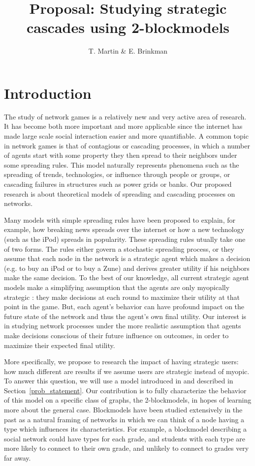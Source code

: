 \documentclass{article}
\title{Proposal: Studying strategic cascades using 2-blockmodels}
\author{T. Martin \& E. Brinkman}
\begin{document}
\maketitle

\section{Introduction}
\label{intro}

The study of network games is a relatively new and very active area of research. It has become both more important and more applicable since the internet has made large scale social interaction easier and more quantifiable. A common topic in network games is that of contagious or cascading processes, in which a number of agents start with some property they then spread to their neighbors under some spreading rules. This model naturally represents phenomena such as the spreading of trends, technologies, or influence through people or groups, or cascading failures in structures such as power grids or banks. Our proposed research is about theoretical models of spreading and cascading processes on networks.

Many models with simple spreading rules have been proposed \cite{Arthur89, Morris00, Watts02} to explain, for example, how breaking news spreads over the internet or how a new technology (such as the iPod) spreads in popularity. These spreading rules utually take one of two forms. The rules either govern a stochastic spreading process, or they assume that each node in the network is a strategic agent which makes a decision (e.g. to buy an iPod or to buy a Zune) and derives greater utility if his neighbors make the same decision. To the best of our knowledge, all current strategic agent models make a simplifying assumption that the agents are only myopically strategic \cite{Chierichetti12}: they make decisions at each round to maximize their utility at that point in the game. But, each agent's behavior can have profound impact on the future state of the network and thus the agent's own final utility. Our interest is in studying network processes under the more realistic assumption that agents make decisions conscious of their future influence on outcomes, in order to maximize their expected final utility.

More specifically, we propose to research the impact of having strategic users: how much different are results if we assume users are strategic instead of myopic. To answer this question, we will use a model introduced in \cite{Chierichetti12} and described in Section~\ref{prob_statement}. Our contribution is to fully characterize the behavior of this model on a specific class of graphs, the 2-blockmodels, in hopes of learning more about the general case. Blockmodels have been studied extensively in the past \cite{Wang87, Snijders97} as a natural framing of networks in which we can think of a node having a type which influences its characteristics. For example, a blockmodel describing a social network could have types for each grade, and students with each type are more likely to connect to their own grade, and unlikely to connect to grades very far away.
\end{document}
